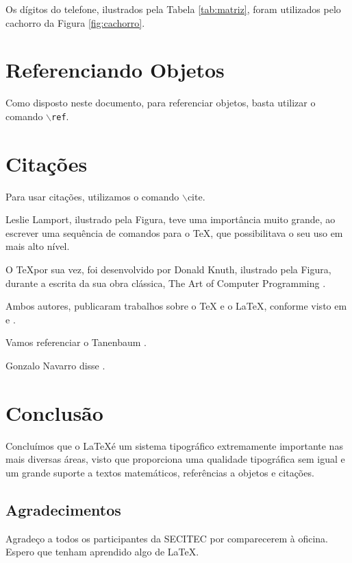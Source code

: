 \documentclass{article}
\begin{document}
Os dígitos do telefone, ilustrados pela Tabela \ref{tab:matriz}, foram utilizados pelo cachorro da Figura
\ref{fig:cachorro}.

\section{Referenciando Objetos}
Como disposto neste documento, para referenciar objetos, basta utilizar o comando {\tt $\backslash$ref}.
\section{Citações}
Para usar citações, utilizamos o comando {$\backslash$cite}.

Leslie Lamport, ilustrado pela Figura, teve uma importância muito grande, ao escrever uma sequência de comandos para o \TeX, que possibilitava o seu uso em mais alto nível.

O \TeX por sua vez, foi desenvolvido por Donald Knuth, ilustrado pela Figura,  durante a escrita da sua obra clássica, The Art of Computer Programming \cite{Knuth81}.

Ambos autores, publicaram trabalhos sobre o \TeX{} e o \LaTeX, conforme visto em \cite{knuth1979tex} e \cite{lamport1986document}.

Vamos referenciar o Tanenbaum \cite{DBLP:books/daglib/0019513}.

Gonzalo Navarro disse \cite{DBLP:journals/cn/KimKDTDN15}.

\section{Conclusão}
Concluímos que o \LaTeX é um sistema tipográfico extremamente importante nas mais diversas áreas, visto que proporciona uma qualidade tipográfica sem igual e um grande suporte a textos matemáticos, referências a objetos e citações.
\subsection{Agradecimentos}
Agradeço a todos os participantes da SECITEC por comparecerem à oficina. Espero que tenham aprendido algo de \LaTeX.



\end{document}
